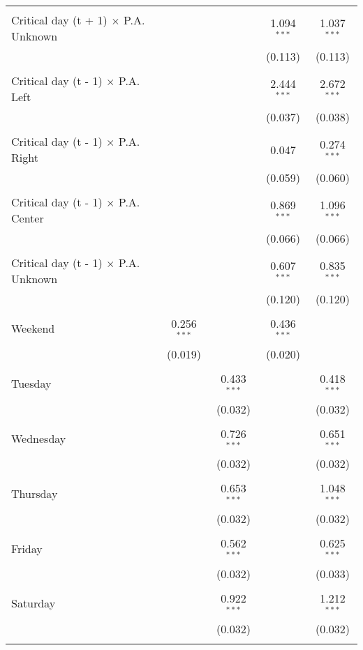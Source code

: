 \documentclass[
]{article}
\begin{document}
\begin{table}[!htbp]
{\begin{tabular}{@{\extracolsep{5pt}}lcccc}
  & & & & \\ 
 Critical day (t + 1) $\times$ P.A. Unknown &  &  & 1.094$^{***}$ & 1.037$^{***}$ \\ 
  &  &  & (0.113) & (0.113) \\ 
  & & & & \\ 
 Critical day (t - 1) $\times$ P.A. Left &  &  & 2.444$^{***}$ & 2.672$^{***}$ \\ 
  &  &  & (0.037) & (0.038) \\ 
  & & & & \\ 
 Critical day (t - 1) $\times$ P.A. Right &  &  & 0.047 & 0.274$^{***}$ \\ 
  &  &  & (0.059) & (0.060) \\ 
  & & & & \\ 
 Critical day (t - 1) $\times$ P.A. Center &  &  & 0.869$^{***}$ & 1.096$^{***}$ \\ 
  &  &  & (0.066) & (0.066) \\ 
  & & & & \\ 
 Critical day (t - 1) $\times$ P.A. Unknown &  &  & 0.607$^{***}$ & 0.835$^{***}$ \\ 
  &  &  & (0.120) & (0.120) \\ 
  & & & & \\ 
 Weekend & 0.256$^{***}$ &  & 0.436$^{***}$ &  \\ 
  & (0.019) &  & (0.020) &  \\ 
  & & & & \\ 
 Tuesday &  & 0.433$^{***}$ &  & 0.418$^{***}$ \\ 
  &  & (0.032) &  & (0.032) \\ 
  & & & & \\ 
 Wednesday &  & 0.726$^{***}$ &  & 0.651$^{***}$ \\ 
  &  & (0.032) &  & (0.032) \\ 
  & & & & \\ 
 Thursday &  & 0.653$^{***}$ &  & 1.048$^{***}$ \\ 
  &  & (0.032) &  & (0.032) \\ 
  & & & & \\ 
 Friday &  & 0.562$^{***}$ &  & 0.625$^{***}$ \\ 
  &  & (0.032) &  & (0.033) \\ 
  & & & & \\ 
 Saturday &  & 0.922$^{***}$ &  & 1.212$^{***}$ \\ 
  &  & (0.032) &  & (0.032) \\ 
  & & & & \\ 

\end{tabular}}
\end{table}
\end{document}
